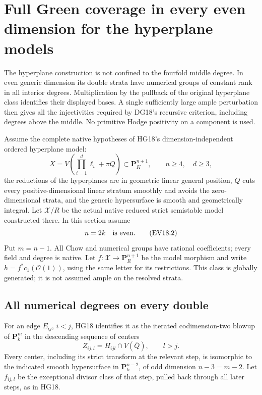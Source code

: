 \section{Full Green coverage in every even dimension for the hyperplane models}
\label{r18ev:section}

The hyperplane construction is not confined to the fourfold middle
degree.  In even generic dimension its double strata have numerical
groups of constant rank in all interior degrees.  Multiplication by
the pullback of the original hyperplane class identifies their
displayed bases.  A single sufficiently large ample perturbation
then gives all the injectivities required by DG18's recursive
criterion, including degrees above the middle.  No primitive
Hodge positivity on a component is used.

Assume the complete native hypotheses of HG18's
dimension-independent ordered hyperplane model:
\[
       X=V\!\left(\prod_{i=1}^d\ell_i+\pi Q\right)
                                      \subset\mathbf P_K^{n+1},
 \qquad n\ge4,\quad d\ge3,
 \tag{EV18.1}\label{r18ev:model}
\]
the reductions of the hyperplanes are in geometric linear general
position, $\bar Q$ cuts every positive-dimensional linear stratum
smoothly and avoids the zero-dimensional strata, and the generic
hypersurface is smooth and geometrically integral.  Let
$\mathcal X/R$ be the actual native reduced strict semistable model
constructed there.  In this section assume
\[
                              n=2k\quad\hbox{is even}.
 \tag{EV18.2}\label{r18ev:parity}
\]
Put $m=n-1$.  All Chow and numerical groups have rational
coefficients; every field and degree is native.
Let $f:\mathcal X\to\mathbf P_R^{n+1}$ be the model morphism and
write $h=f^*c_1(\mathcal O(1))$, using the same letter for its
restrictions.  This class is globally generated; it is not
assumed ample on the resolved strata.

\subsection{All numerical degrees on every double}

For an edge $E_{ij}$, $i<j$, HG18 identifies it as the iterated
codimension-two blowup of $\mathbf P_k^m$ in the descending
sequence of centers
\[
              Z_{ij,l}=H_{ijl}\cap V(\bar Q),\qquad l>j.
 \tag{EV18.3}\label{r18ev:centers}
\]
Every center, including its strict transform at the relevant step,
is isomorphic to the indicated smooth hypersurface in
$\mathbf P_k^{n-2}$, of odd dimension $n-3=m-2$.
Let $f_{ij,l}$ be the exceptional divisor class of that step,
pulled back through all later steps, as in HG18.

